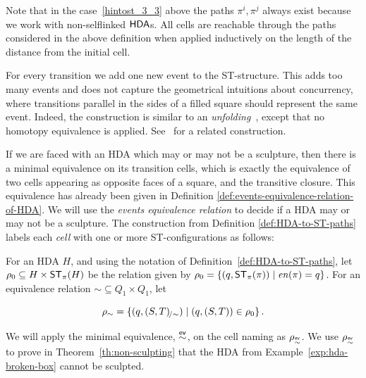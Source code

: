     Note that in the case~\ref{hintost_3_3} above the paths $\pi^{i},\pi^{j}$ always exist because we work with non-selflinked $\text{\textup{\textsf{HDA}}}$s. 
    All cells are reachable through the paths considered in the above definition when applied inductively on the length of the distance from the initial cell.
    
    For every transition we add one new event to the ST-structure. This adds too many events and does not capture the geometrical intuitions about concurrency, where transitions parallel in the sides of a filled square should represent the same event. Indeed, the construction is similar to an \emph{unfolding}~\cite{Fahrenberg15PartialHDA}, except that no homotopy equivalence is applied. See~\cite[Def.~3.39]{Johansen16STstruct} for a related construction.
    
    If we are faced with an HDA which may or may not be a sculpture, then there is a minimal equivalence on its transition cells, which is exactly the equivalence of two cells appearing as opposite faces of a square, and the transitive closure. This equivalence has already been given in Definition \ref{def:events-equivalence-relation-of-HDA}. We will use the \emph{events equivalence relation} to decide if a HDA may or may not be a sculpture. The construction from Definition \ref{def:HDA-to-ST-paths} labels each \emph{cell} with one or more ST-configurations as follows:
    
    \begin{definition}
        For an HDA $H$, and using the notation of Definition~\ref{def:HDA-to-ST-paths}, let $\rho_0\subseteq H\times \mathsf{ST}_{\pi}(H)$ be the relation given by $\rho_0=\{( q, \mathsf{ST}_{\pi}( \pi))\mid \mathit{en}(\pi)= q\}$.  For an equivalence relation $\mathord\sim\subseteq Q_1\times Q_1$, let
        
        \begin{equation*}
            \rho_\sim=\{( q, ( S, T)_{\!/\mathord{\sim}})\mid( q,( S, T)) \in \rho_0\}\,.
        \end{equation*}
    \end{definition}
    
    We will apply the minimal equivalence, $\stackrel{\mathsf{ev}}{\sim}$, on the cell naming as $\rho_{\stackrel{\mathsf{ev}}{\sim}}$.
    We use $\rho_{\stackrel{\mathsf{ev}}{\sim}}$ to prove in Theorem~\ref{th:non-sculpting} that the HDA from Example~\ref{exp:hda-broken-box} cannot be sculpted.

